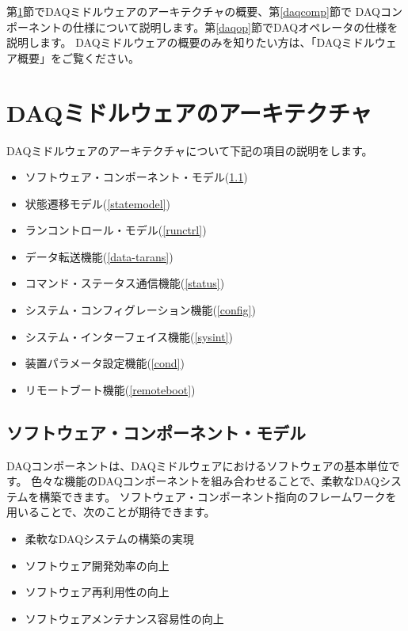 \documentclass[a4j,10pt,dvips,onecolumn,oneside,final]{jarticle}%
\begin{document}
第\ref{arch}節でDAQミドルウェアのアーキテクチャの概要、第\ref{daqcomp}節で
DAQコンポーネントの仕様について説明します。第\ref{daqop}節でDAQオペレータの仕様を説明します。
DAQミドルウェアの概要のみを知りたい方は、「DAQミドルウェア概要\cite{OVERVIEW}」をご覧ください。

\section{DAQミドルウェアのアーキテクチャ}\label{arch}
DAQミドルウェアのアーキテクチャについて下記の項目の説明をします。
\begin{itemize}
\item ソフトウェア・コンポーネント・モデル(\ref{compmodel})
\item 状態遷移モデル(\ref{statemodel})
\item ランコントロール・モデル(\ref{runctrl})
\item データ転送機能(\ref{data-tarans})
\item コマンド・ステータス通信機能(\ref{status})
\item システム・コンフィグレーション機能(\ref{config})
\item システム・インターフェイス機能(\ref{sysint})
\item 装置パラメータ設定機能(\ref{cond})
\item リモートブート機能(\ref{remoteboot})
\end{itemize}

\subsection{ソフトウェア・コンポーネント・モデル}\label{compmodel}
DAQコンポーネントは、DAQミドルウェアにおけるソフトウェアの基本単位です。
色々な機能のDAQコンポーネントを組み合わせることで、柔軟なDAQシステムを構築できます。
ソフトウェア・コンポーネント指向のフレームワークを用いることで、次のことが期待できます。
\begin{itemize}
\item 柔軟なDAQシステムの構築の実現
\item ソフトウェア開発効率の向上
\item ソフトウェア再利用性の向上
\item ソフトウェアメンテナンス容易性の向上
\end{itemize}
\end{document}
